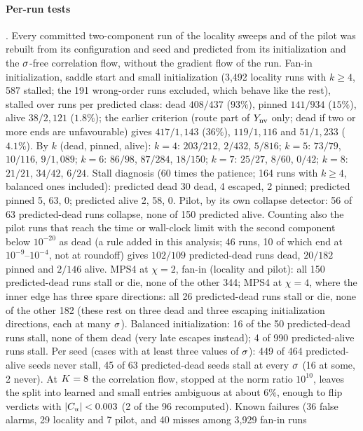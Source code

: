 \paragraph{Per-run tests} \empirical.
Every committed two-component run of the locality sweeps and of the pilot was rebuilt from its configuration and seed
and predicted from its initialization and the $\sigma$-free correlation flow, without the gradient flow of the run. Fan-in initialization, saddle start and small initialization (3,492 locality
runs with $k\ge4$, 587 stalled; the 191 wrong-order runs excluded, which behave like the rest), stalled over runs per
predicted class: dead $408/437$ ($93\%$), pinned $141/934$ ($15\%$), alive $38/2{,}121$ ($1.8\%$); the earlier criterion
(route part of $Y_{\rm nv}$ only; dead if two or more ends are unfavourable) gives $417/1{,}143$ ($36\%$), $119/1{,}116$ and
$51/1{,}233$ ($4.1\%$). By $k$ (dead, pinned, alive): $k=4$: $203/212$, $2/432$, $5/816$; $k=5$: $73/79$, $10/116$,
$9/1{,}089$; $k=6$: $86/98$, $87/284$, $18/150$; $k=7$: $25/27$, $8/60$, $0/42$; $k=8$: $21/21$, $34/42$, $6/24$. Stall
diagnosis (60 times the patience; 164 runs with $k\ge4$, balanced ones included): predicted dead 30 dead, 4 escaped,
2 pinned; predicted pinned 5, 63, 0; predicted alive 2, 58, 0. Pilot, by its own collapse detector: 56 of 63 predicted-dead runs collapse, none of 150 predicted
alive. Counting also the pilot runs that reach the time or wall-clock limit with the second component below
$10^{-20}$ as dead (a rule added in this analysis; 46 runs, 10 of which end at $10^{-9}$--$10^{-4}$, not at roundoff)
gives $102/109$ predicted-dead runs dead, $20/182$ pinned and $2/146$ alive. MPS4 at $\chi=2$, fan-in (locality and
pilot): all 150 predicted-dead runs stall or die, none of the other 344; MPS4 at $\chi=4$, where the inner edge has
three spare directions: all 26 predicted-dead runs stall or die, none of the other 182 (these rest on three dead and
three escaping initialization directions, each at many $\sigma$). Balanced initialization: 16 of the 50
predicted-dead runs stall, none of them dead (very late escapes instead); 4 of 990 predicted-alive runs stall. Per seed
(cases with at least three values of $\sigma$): 449 of 464 predicted-alive seeds never stall, 45 of 63 predicted-dead
seeds stall at every $\sigma$ (16 at some, 2 never). At $K=8$ the correlation flow, stopped at the norm ratio $10^{10}$, leaves
the split into learned and small entries ambiguous at about $6\%$, enough to flip verdicts with $\lvert C_u\rvert<0.003$ (2 of
the 96 recomputed). Known failures (36 false alarms, 29 locality and 7 pilot, and 40 misses among 3,929 fan-in runs
